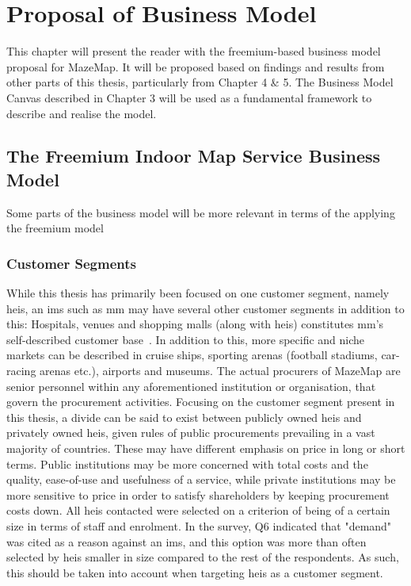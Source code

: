 \chapter{Proposal of Business Model}
This chapter will present the reader with the freemium-based business model proposal for MazeMap. It will be proposed based on findings and results from other parts of this thesis, particularly from Chapter 4 \& 5. The Business Model Canvas described in Chapter 3 will be used as a fundamental framework to describe and realise the model.


\section{The Freemium Indoor Map Service Business Model}
Some parts of the business model will be more relevant in terms of the applying the freemium model

\subsection{Customer Segments}
While this thesis has primarily been focused on one customer segment, namely \glspl{hei}, an \gls{ims} such as \gls{mm} may have several other customer segments in addition to this: Hospitals, venues and shopping malls (along with \glspl{hei}) constitutes \gls{mm}'s self-described customer base~\cite{mazemap}. In addition to this, more specific and niche markets can be described in cruise ships, sporting arenas (football stadiums, car-racing arenas etc.), airports and museums. The actual procurers of MazeMap are senior personnel within any aforementioned institution or organisation, that govern the procurement activities. Focusing on the customer segment present in this thesis, a divide can be said to exist between publicly owned \glspl{hei} and privately owned \glspl{hei}, given rules of public procurements prevailing in a vast majority of countries. These may have different emphasis on price in long or short terms. Public institutions may be more concerned with total costs and the quality, ease-of-use and usefulness of a service, while private institutions may be more sensitive to price in order to satisfy shareholders by keeping procurement costs down. All \glspl{hei} contacted were selected on a criterion of being of a certain size in terms of staff and enrolment. In the survey, Q6 indicated that "demand" was cited as a reason against an \gls{ims}, and this option was more than often selected by \glspl{hei} smaller in size compared to the rest of the respondents. As such, this should be taken into account when targeting \glspl{hei} as a customer segment.


